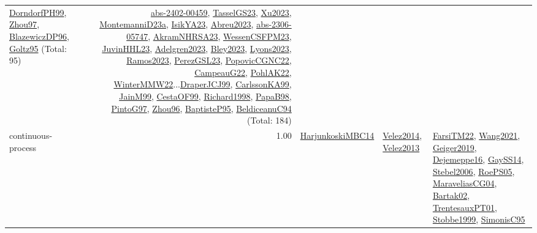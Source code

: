 {\begin{longtable}{p{3cm}r>{\raggedright\arraybackslash}p{6cm}>{\raggedright\arraybackslash}p{6cm}>{\raggedright\arraybackslash}p{8cm}}
\hyperref[detail:DorndorfPH99]{DorndorfPH99}, \hyperref[detail:Zhou97]{Zhou97}, \hyperref[detail:BlazewiczDP96]{BlazewiczDP96}, \hyperref[detail:Goltz95]{Goltz95} (Total: 95) & \hyperref[detail:abs-2402-00459]{abs-2402-00459}, \hyperref[detail:TasselGS23]{TasselGS23}, \hyperref[detail:Xu2023]{Xu2023}, \hyperref[detail:MontemanniD23a]{MontemanniD23a}, \hyperref[detail:IsikYA23]{IsikYA23}, \hyperref[detail:Abreu2023]{Abreu2023}, \hyperref[detail:abs-2306-05747]{abs-2306-05747}, \hyperref[detail:AkramNHRSA23]{AkramNHRSA23}, \hyperref[detail:WessenCSFPM23]{WessenCSFPM23}, \hyperref[detail:JuvinHHL23]{JuvinHHL23}, \hyperref[detail:Adelgren2023]{Adelgren2023}, \hyperref[detail:Bley2023]{Bley2023}, \hyperref[detail:Lyons2023]{Lyons2023}, \hyperref[detail:Ramos2023]{Ramos2023}, \hyperref[detail:PerezGSL23]{PerezGSL23}, \hyperref[detail:PopovicCGNC22]{PopovicCGNC22}, \hyperref[detail:CampeauG22]{CampeauG22}, \hyperref[detail:PohlAK22]{PohlAK22}, \hyperref[detail:WinterMMW22]{WinterMMW22}...\hyperref[detail:DraperJCJ99]{DraperJCJ99}, \hyperref[detail:CarlssonKA99]{CarlssonKA99}, \hyperref[detail:JainM99]{JainM99}, \hyperref[detail:CestaOF99]{CestaOF99}, \hyperref[detail:Richard1998]{Richard1998}, \hyperref[detail:PapaB98]{PapaB98}, \hyperref[detail:PintoG97]{PintoG97}, \hyperref[detail:Zhou96]{Zhou96}, \hyperref[detail:BaptisteP95]{BaptisteP95}, \hyperref[detail:BeldiceanuC94]{BeldiceanuC94} (Total: 184)\\
\index{continuous-process}\index{Concepts!continuous-process}continuous-process &  1.00 & \hyperref[detail:HarjunkoskiMBC14]{HarjunkoskiMBC14} & \hyperref[detail:Velez2014]{Velez2014}, \hyperref[detail:Velez2013]{Velez2013} & \hyperref[detail:FarsiTM22]{FarsiTM22}, \hyperref[detail:Wang2021]{Wang2021}, \hyperref[detail:Geiger2019]{Geiger2019}, \hyperref[detail:Dejemeppe16]{Dejemeppe16}, \hyperref[detail:GaySS14]{GaySS14}, \hyperref[detail:Stebel2006]{Stebel2006}, \hyperref[detail:RoePS05]{RoePS05}, \hyperref[detail:MaraveliasCG04]{MaraveliasCG04}, \hyperref[detail:Bartak02]{Bartak02}, \hyperref[detail:TrentesauxPT01]{TrentesauxPT01}, \hyperref[detail:Stobbe1999]{Stobbe1999}, \hyperref[detail:SimonisC95]{SimonisC95}\\

\end{longtable}}
